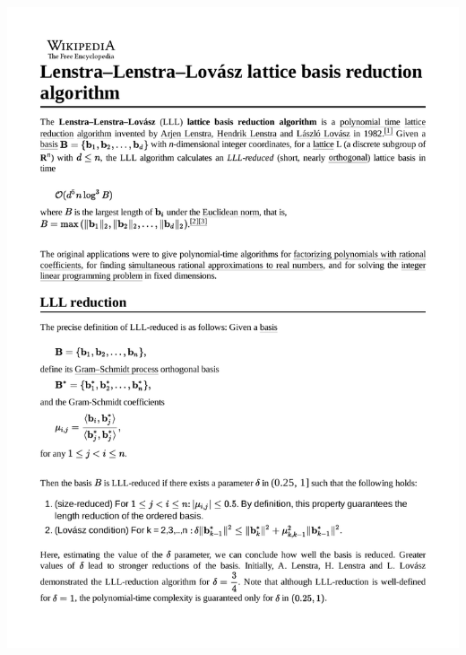 \documentclass{beamer}
\begin{document}
\begin{frame}
\includegraphics[width=\textwidth]{Lenstra–Lenstra–Lovasz_lattice_basis_reduction_algorithm.pdf}
\end{frame}
\end{document}
